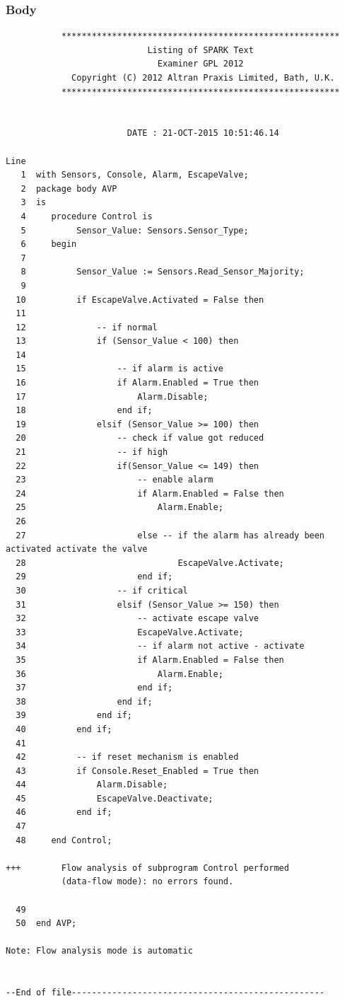 \documentclass[a4paper, titlepage]{article}
\begin{document}
\subsubsection{Body}
{\small
\begin{lstlisting}
           *******************************************************
                            Listing of SPARK Text
                              Examiner GPL 2012
             Copyright (C) 2012 Altran Praxis Limited, Bath, U.K.
           *******************************************************


                        DATE : 21-OCT-2015 10:51:46.14

Line
   1  with Sensors, Console, Alarm, EscapeValve;
   2  package body AVP
   3  is
   4     procedure Control is
   5          Sensor_Value: Sensors.Sensor_Type;
   6     begin 
   7  
   8          Sensor_Value := Sensors.Read_Sensor_Majority;
   9     
  10          if EscapeValve.Activated = False then
  11  
  12              -- if normal
  13              if (Sensor_Value < 100) then
  14                  
  15                  -- if alarm is active
  16                  if Alarm.Enabled = True then
  17                      Alarm.Disable;
  18                  end if;
  19              elsif (Sensor_Value >= 100) then
  20                  -- check if value got reduced
  21                  -- if high
  22                  if(Sensor_Value <= 149) then
  23                      -- enable alarm
  24                      if Alarm.Enabled = False then
  25                          Alarm.Enable;
  26  
  27                      else -- if the alarm has already been activated activate the valve  
  28                              EscapeValve.Activate;
  29                      end if;
  30                  -- if critical
  31                  elsif (Sensor_Value >= 150) then
  32                      -- activate escape valve
  33                      EscapeValve.Activate;
  34                      -- if alarm not active - activate
  35                      if Alarm.Enabled = False then
  36                          Alarm.Enable;
  37                      end if;
  38                  end if;
  39              end if;
  40          end if;
  41          
  42          -- if reset mechanism is enabled
  43          if Console.Reset_Enabled = True then
  44              Alarm.Disable;
  45              EscapeValve.Deactivate;
  46          end if;
  47  
  48     end Control;

+++        Flow analysis of subprogram Control performed 
           (data-flow mode): no errors found.

  49     
  50  end AVP;

Note: Flow analysis mode is automatic


--End of file--------------------------------------------------

\end{lstlisting}
}
\end{document}

